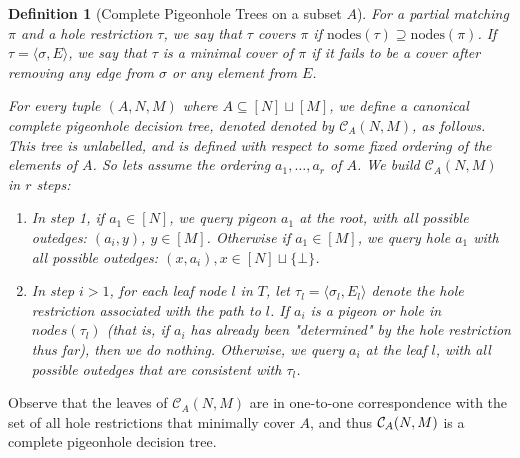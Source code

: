 \documentclass[11pt]{article}
\newtheorem{definition}{Definition}
\newcommand{\nodes}{\mathrm{nodes}}
\begin{document}
\begin{definition}[Complete Pigeonhole Trees on a subset $A$] 
For a partial matching $\pi$ and a hole restriction $\tau$, we say that $\tau$ covers $\pi$ if $\nodes(\tau) \supseteq \nodes(\pi)$. If $\tau = \langle \sigma, E\rangle$, we say that $\tau$ is a minimal cover of $\pi$ if it fails to be a cover after removing any edge from $\sigma$ or any element from $E$.

For every tuple $(A,N,M)$ where $A \subseteq [N] \sqcup [M]$, 
we define a canonical complete pigeonhole decision tree, denoted denoted by $\mathcal{C}_A(N,M)$, as follows. This tree is unlabelled, and is defined with respect to some fixed ordering of the elements of $A$. So lets assume the ordering $a_1,\ldots,a_r$ of $A$. 
We build $\mathcal{C}_A(N,M)$ in $r$ steps:
\begin{enumerate}
    \item In step 1, if $a_1 \in [N]$, we query pigeon $a_1$ at the root, with all possible outedges: $(a_i,y)$, $y \in [M]$. Otherwise if $a_1 \in [M]$, we query hole $a_1$ with all possible outedges: $(x,a_i), x \in [N] \sqcup \{\bot\}$. 
    \item In step $i>1$, for each leaf node $l$ in $T$, let $\tau_l = \langle \sigma_l,E_l \rangle$ denote the hole restriction associated with the path to $l$.  If $a_i$ is a pigeon or hole in $nodes(\tau_l)$ (that is, if $a_i$ has already been "determined" by the hole restriction thus far), then we do nothing.  Otherwise,  we query $a_i$ at the leaf $l$, with all possible outedges that are consistent with $\tau_l$. 
    \end{enumerate}
\end{definition}
Observe that the leaves of $\mathcal{C}_A(N,M)$ are in one-to-one correspondence with the set of all hole restrictions that minimally cover $A$, and thus ${\cal C}_A(N,M)$ is a complete pigeonhole decision tree.
\end{document}
